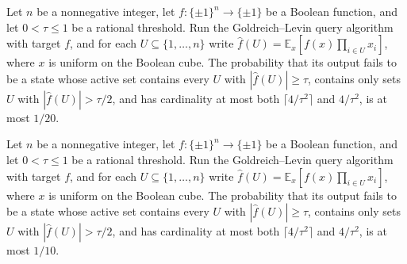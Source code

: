 \begin{theorem}
\label{FABL.goldreichLevinQueryProgram_incorrectProbability_le_one_twentieth}
\leanok
{}
Let $n$ be a nonnegative integer, let $f:\{\pm1\}^n\to\{\pm1\}$ be a Boolean function,
and let $0<\tau\le 1$ be a rational threshold. Run the Goldreich–Levin query algorithm
with target $f$, and for each $U\subseteq\{1,\ldots,n\}$ write $\widehat f(U)=\mathbb
E_x[f(x)\prod_{i\in U}x_i]$, where $x$ is uniform on the Boolean cube. The probability
that its output fails to be a state whose active set contains every $U$ with $|\widehat
f(U)|\ge\tau$, contains only sets $U$ with $|\widehat f(U)|>\tau/2$, and has cardinality
at most both $\lceil4/\tau^2\rceil$ and $4/\tau^2$, is at most $1/20$.
\end{theorem}

\begin{theorem}
\label{FABL.goldreichLevinQueryProgram_incorrectProbability_le_one_tenth}
\leanok
{}
Let $n$ be a nonnegative integer, let $f:
\{\pm1\}^n\to\{\pm1\}$ be a Boolean function, and let $0<\tau\le 1$ be a rational
threshold. Run the Goldreich–Levin query algorithm with target $f$, and for each
$U\subseteq\{1,\ldots,n\}$ write $\widehat f(U)=\mathbb E_x[f(x)\prod_{i\in U}x_i]$,
where $x$ is uniform on the Boolean cube. The probability that its output fails to be a
state whose active set contains every $U$ with $|\widehat f(U)|\ge\tau$, contains only
sets $U$ with $|\widehat f(U)|>\tau/2$, and has cardinality at most both
$\lceil4/\tau^2\rceil$ and $4/\tau^2$, is at most $1/10$.
\end{theorem}
